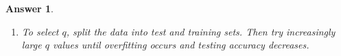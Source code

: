 \documentclass[12pt]{article}
\theoremstyle{colon}
\newtheorem*{answer}{Answer}
\begin{document}
\begin{answer}
\begin{enumerate}[label=\alph*)]
      \begin{gather*}
        \min_{a_0, a_1, a_2, b_1, b_2 \in \mathbb{R}} \left\lVert \begin{bmatrix} y_1 \\ \vdots \\ y_m \end{bmatrix} - \begin{bmatrix} 1/2 & \cos(2 \pi x_1) & \sin(2 \pi x_1) & \cos(4 \pi x_1) & \sin(4 \pi x_1) \\ \vdots & & & & \vdots \\ 1/2 & \cos(2 \pi x_m) & \sin(2 \pi x_m) & \cos(4 \pi x_m) & \sin(4 \pi x_m) \end{bmatrix} \begin{bmatrix} a_0 \\ a_1 \\ b_1 \\ a_2 \\ b_2 \end{bmatrix} \right\rVert_2^2 \\
        + \lambda \left\lVert \begin{bmatrix} 1 & 0 & 0 & 0 & 0 \\ 0 & 2 & 0 & 0 & 0 \\ 0 & 0 & 2 & 0 & 0 \\ 0 & 0 & 0 & 3 & 0 \\ 0 & 0 & 0 & 0 & 3 \end{bmatrix} \begin{bmatrix} a_0 \\ a_1 \\ b_1 \\ a_2 \\ b_2 \end{bmatrix} \right\rVert_2^2
      \end{gather*}

    \item To select $q$, split the data into test and training sets. Then try increasingly large $q$ values until overfitting occurs and testing accuracy decreases.
  \end{enumerate}

\end{answer}

\clearpage
\end{document}
